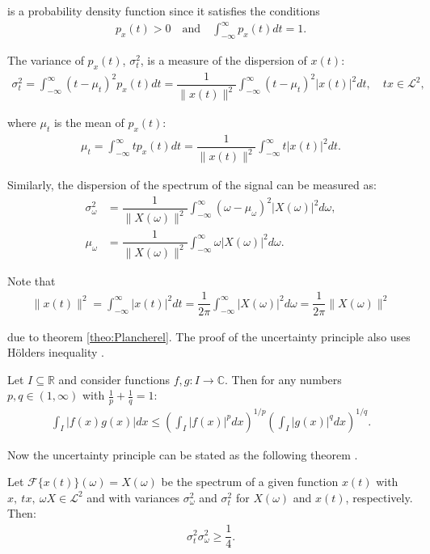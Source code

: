 is a probability density function since it satisfies the conditions
\begin{align*}
p_x(t) > 0 \quad \text{and} \quad \int_{-\infty}^\infty p_x(t) dt = 1.
\end{align*}

The variance of $p_x(t)$, $\sigma_t^2$, is a measure of the dispersion of $x(t)$:
\begin{align*}
\sigma_t^2 = \int_{-\infty}^\infty (t - \mu_t)^2 p_x(t) dt = \dfrac{1}{\|x(t)\|^2} \int_{-\infty}^\infty (t - \mu_t)^2 |x(t)|^2 dt, \quad tx \in \mathcal{L}^2,
\end{align*}

where $\mu_t$ is the mean of $p_x(t)$:
\begin{align*}
\mu_t = \int_{-\infty}^\infty t p_x(t) dt = \dfrac{1}{\|x(t)\|^2} \int_{-\infty}^\infty t |x(t)|^2 dt.
\end{align*}

Similarly, the dispersion of the spectrum of the signal can be measured as:
\begin{align*}
\sigma_\omega^2 &= \dfrac{1}{\|X(\omega)\|^2} \int_{-\infty}^\infty (\omega - \mu_\omega)^2 |X(\omega)|^2 d\omega, \\
\mu_\omega &= \dfrac{1}{\|X(\omega)\|^2} \int_{-\infty}^\infty \omega |X(\omega)|^2 d\omega.
\end{align*}

Note that
\begin{align*}
\|x(t)\|^2 = \int_{-\infty}^\infty |x(t)|^2 dt = \dfrac{1}{2\pi} \int_{-\infty}^\infty |X(\omega)|^2 d\omega = \dfrac{1}{2\pi} \|X(\omega)\|^2
\end{align*}

due to theorem \ref{theo:Plancherel}. The proof of the uncertainty principle also uses Hölders inequality \cite{page 19, FSE2010}.
\begin{theorem} \label{theo:Hölder}
Let $I \subseteq \mathbb{R}$ and consider functions $f,g: I \to \mathbb{C}$. Then for any numbers $p,q \in (1,\infty)$ with $\frac{1}{p} + \frac{1}{q} = 1$:
\begin{align*}
\int_I |f(x) g(x)| dx \leq \left( \int_I |f(x)|^p dx \right)^{1/p} \left( \int_I |g(x)|^q dx \right)^{1/q}.
\end{align*}
\end{theorem}

Now the uncertainty principle can be stated as the following theorem \cite{pages 135-136, Wang}.

\begin{theorem} \label{theo:Heisenberg}
Let $\mathcal{F}\{x(t)\}(\omega) = X(\omega)$ be the spectrum of a given function $x(t)$ with $x, \ tx, \ \omega X \in \mathcal{L}^2$ and with variances $\sigma_\omega^2$ and $\sigma_t^2$ for $X(\omega)$ and $x(t)$, respectively. Then:
\begin{align*}
\sigma_t^2 \sigma_\omega^2 \geq \dfrac{1}{4}.
\end{align*}
\end{theorem}

